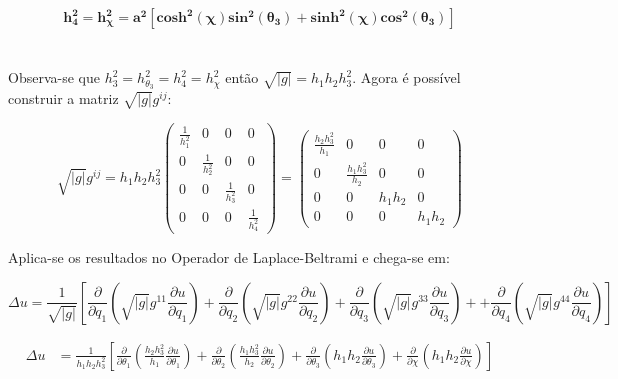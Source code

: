 \documentclass[12pt, a4papper]{article}
\begin{document}
\begin{equation}
\boldsymbol{h_{4}^{2}=h_{\chi}^{2}=a^{2}\left[cosh^{2}(\chi)sin^{2}(\theta_{3})+sinh^{2}(\chi)cos^{2}(\theta_{3})\right]}
\end{equation}
\\
\\
Observa-se que $h_{3}^{2}=h_{\theta_{3}}^{2}=h_{4}^{2}=h_{\chi}^{2}$
então $\sqrt{|g|}=h_{1}h_{2}h_{3}^{2}$. Agora é possível construir
a matriz $\sqrt{|g|}g^{ij}$:

\[
\sqrt{|g|}g^{ij}=h_{1}h_{2}h_{3}^{2}\left(\begin{array}{cccc}
\frac{1}{h_{1}^{2}} & 0 & 0 & 0\\
0 & \frac{1}{h_{2}^{2}} & 0 & 0\\
0 & 0 & \frac{1}{h_{3}^{2}} & 0\\
0 & 0 & 0 & \frac{1}{h_{4}^{2}}
\end{array}\right)=\left(\begin{array}{cccc}
\frac{h_{2}h_{3}^{2}}{h_{1}} & 0 & 0 & 0\\
0 & \frac{h_{1}h_{3}^{2}}{h_{2}} & 0 & 0\\
0 & 0 & h_{1}h_{2} & 0\\
0 & 0 & 0 & h_{1}h_{2}
\end{array}\right)
\]

Aplica-se os resultados no Operador de Laplace-Beltrami e chega-se
em:

\[
\Delta u=\frac{1}{\sqrt{\left\vert g\right\vert }}\left[\frac{\partial}{\partial q_{1}}\left(\sqrt{\left\vert g\right\vert }g^{11}\frac{\partial u}{\partial q_{1}}\right)+\frac{\partial}{\partial q_{2}}\left(\sqrt{\left\vert g\right\vert }g^{22}\frac{\partial u}{\partial q_{2}}\right)+\frac{\partial}{\partial q_{3}}\left(\sqrt{\left\vert g\right\vert }g^{33}\frac{\partial u}{\partial q_{3}}\right)++\frac{\partial}{\partial q_{4}}\left(\sqrt{\left\vert g\right\vert }g^{44}\frac{\partial u}{\partial q_{4}}\right)\right]
\]

\begin{align*}
\Delta u & =\frac{1}{h_{1}h_{2}h_{3}^{2}}\left[\frac{\partial}{\partial\theta_{1}}\left(\frac{h_{2}h_{3}^{2}}{h_{1}}\frac{\partial u}{\partial\theta_{1}}\right)+\frac{\partial}{\partial\theta_{2}}\left(\frac{h_{1}h_{3}^{2}}{h_{2}}\frac{\partial u}{\partial\theta_{2}}\right)+\frac{\partial}{\partial\theta_{3}}\left(h_{1}h_{2}\frac{\partial u}{\partial\theta_{3}}\right)+\frac{\partial}{\partial\chi}\left(h_{1}h_{2}\frac{\partial u}{\partial\chi}\right)\right]
\end{align*}
\end{document}
